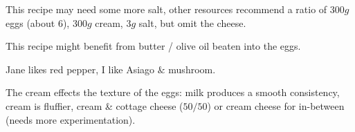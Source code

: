 \begin{experiments}
\item This recipe may need some more salt, other resources recommend a ratio of $300g$ eggs (about 6), $300g$ cream, $3g$ salt, but omit the cheese.
\item This recipe might benefit from butter / olive oil beaten into the eggs.
\end{experiments}

\begin{variation}
\item Jane likes red pepper, I like Asiago $\&$ mushroom.
\item The cream effects the texture of the eggs: milk produces a smooth consistency, cream is fluffier, cream \& cottage cheese ($50/50$) or cream cheese for in-between (needs more experimentation).
\end{variation}

\recipeend